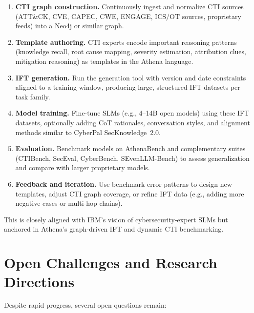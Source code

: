 \documentclass[10pt]{article}
\begin{document}
\begin{enumerate}[leftmargin=*]
  \item \textbf{CTI graph construction.} Continuously ingest and normalize CTI sources (ATT\&CK, CVE, CAPEC, CWE, ENGAGE, ICS/OT sources, proprietary feeds) into a Neo4j or similar graph.
  \item \textbf{Template authoring.} CTI experts encode important reasoning patterns (knowledge recall, root cause mapping, severity estimation, attribution clues, mitigation reasoning) as templates in the Athena language.
  \item \textbf{IFT generation.} Run the generation tool with version and date constraints aligned to a training window, producing large, structured IFT datasets per task family.\cite{cardei2025ift}
  \item \textbf{Model training.} Fine-tune SLMs (e.g., 4--14B open models) using these IFT datasets, optionally adding CoT rationales, conversation styles, and alignment methods similar to CyberPal SecKnowledge~2.0.\cite{levi2025toward}
  \item \textbf{Evaluation.} Benchmark models on AthenaBench and complementary suites (CTIBench, SecEval, CyberBench, SEvenLLM-Bench) to assess generalization and compare with larger proprietary models.\cite{alam2024ctibench,alam2025athenabench,hu2024seceval,liu2024cyberbench,ji2024sevenllm}
  \item \textbf{Feedback and iteration.} Use benchmark error patterns to design new templates, adjust CTI graph coverage, or refine IFT data (e.g., adding more negative cases or multi-hop chains).
\end{enumerate}

This is closely aligned with IBM’s vision of cybersecurity-expert SLMs but anchored in Athena’s graph-driven IFT and dynamic CTI benchmarking.

\section{Open Challenges and Research Directions}

Despite rapid progress, several open questions remain:
\end{document}
